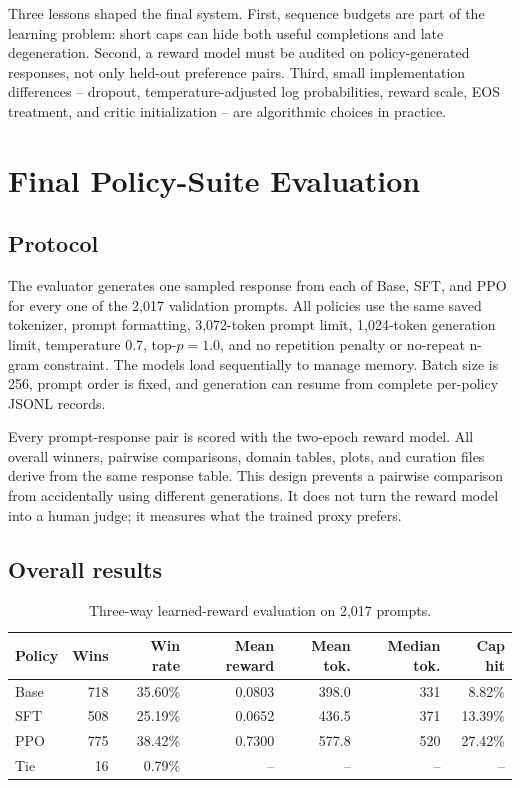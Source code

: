 \documentclass[11pt]{article}
\begin{document}
Three lessons shaped the final system. First, sequence budgets are part of the
learning problem: short caps can hide both useful completions and late
degeneration. Second, a reward model must be audited on policy-generated
responses, not only held-out preference pairs. Third, small implementation
differences -- dropout, temperature-adjusted log probabilities, reward scale,
EOS treatment, and critic initialization -- are algorithmic choices in
practice.

\section{Final Policy-Suite Evaluation}

\subsection{Protocol}

The evaluator generates one sampled response from each of Base, SFT, and PPO
for every one of the 2,017 validation prompts. All policies use the same saved
tokenizer, prompt formatting, 3,072-token prompt limit, 1,024-token generation
limit, temperature 0.7, top-$p=1.0$, and no repetition penalty or no-repeat
n-gram constraint. The models load sequentially to manage memory. Batch size
is 256, prompt order is fixed, and generation can resume from complete
per-policy JSONL records.

Every prompt-response pair is scored with the two-epoch reward model. All
overall winners, pairwise comparisons, domain tables, plots, and curation
files derive from the same response table. This design prevents a pairwise
comparison from accidentally using different generations. It does not turn
the reward model into a human judge; it measures what the trained proxy
prefers.

\subsection{Overall results}

\begin{table}[H]
\centering
\caption{Three-way learned-reward evaluation on 2,017 prompts.}
\label{tab:overall}
\begin{tabular}{@{}lrrrrrr@{}}
\toprule
\textbf{Policy} &
\textbf{Wins} &
\textbf{Win rate} &
\textbf{Mean reward} &
\textbf{Mean tok.} &
\textbf{Median tok.} &
\textbf{Cap hit}\\
\midrule
Base & 718 & 35.60\% & 0.0803 & 398.0 & 331 & 8.82\%\\
SFT & 508 & 25.19\% & 0.0652 & 436.5 & 371 & 13.39\%\\
PPO & 775 & 38.42\% & 0.7300 & 577.8 & 520 & 27.42\%\\
Tie & 16 & 0.79\% & -- & -- & -- & --\\
\bottomrule
\end{tabular}
\end{table}
\end{document}
